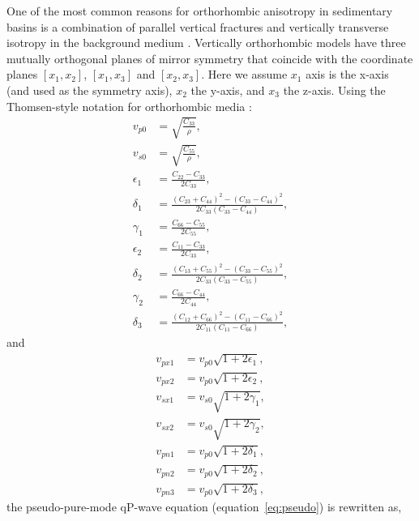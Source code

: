 
One of the most common reasons for orthorhombic anisotropy in sedimentary basins is a combination of parallel 
vertical fractures and vertically transverse isotropy in the background medium \cite[]{wild.crampin:1991,
schoenberg.helbig:1997}.
Vertically orthorhombic models have three mutually
orthogonal planes of mirror symmetry that coincide with the coordinate planes $[x_{1},x_{2}]$, $[x_{1},x_{3}]$ and
 $[x_{2},x_{3}]$. Here we assume $x_{1}$ axis is the x-axis (and used as the symmetry axis),
 $x_{2}$ the y-axis, and $x_{3}$ the z-axis.
Using the Thomsen-style notation for orthorhombic media \cite[]{tsvankin:1997b}:
\begin{equation}
\begin{split}
v_{p0}&=\sqrt{\frac{C_{33}}{\rho}}, \\
v_{s0}&=\sqrt{\frac{C_{55}}{\rho}}, \\
\epsilon_{1}&=\frac{C_{22}-C_{33}}{2C_{33}}, \\
\delta_{1}&=\frac{(C_{23}+C_{44})^2-(C_{33}-C_{44})^2}{2C_{33}(C_{33}-C_{44})}, \\
\gamma_{1}&=\frac{C_{66}-C_{55}}{2C_{55}}, \\
\epsilon_{2}&=\frac{C_{11}-C_{33}}{2C_{33}}, \\
\delta_{2}&=\frac{(C_{13}+C_{55})^2-(C_{33}-C_{55})^2}{2C_{33}(C_{33}-C_{55})}, \\
\gamma_{2}&=\frac{C_{66}-C_{44}}{2C_{44}}, \\
\delta_{3}&=\frac{(C_{12}+C_{66})^2-(C_{11}-C_{66})^2}{2C_{11}(C_{11}-C_{66})}, 
\end{split}
\end{equation}
	and
\begin{equation}
\begin{split}
v_{px1}&=v_{p0}\sqrt{1+2\epsilon_{1}}, \\
v_{px2}&=v_{p0}\sqrt{1+2\epsilon_{2}}, \\
v_{sx1}&=v_{s0}\sqrt{1+2\gamma_{1}}, \\
v_{sx2}&=v_{s0}\sqrt{1+2\gamma_{2}}, \\
v_{pn1}&= v_{p0}\sqrt{1+2\delta_{1}}, \\
v_{pn2}&= v_{p0}\sqrt{1+2\delta_{2}}, \\
v_{pn3}&= v_{p0}\sqrt{1+2\delta_{3}},
\end{split}
\end{equation}
the pseudo-pure-mode qP-wave equation (equation~\ref{eq:pseudo}) is rewritten as,
